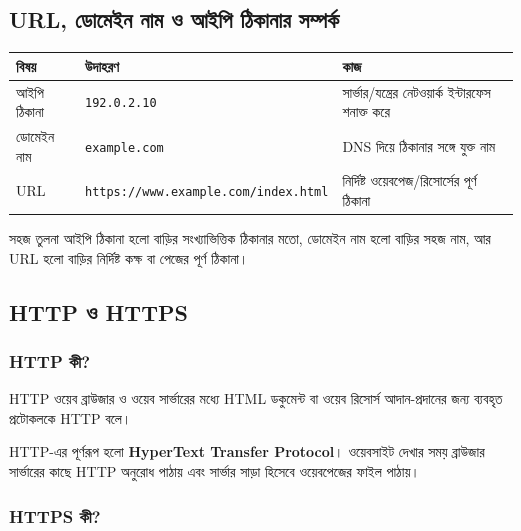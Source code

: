 \subsection{URL, ডোমেইন নাম ও আইপি ঠিকানার সম্পর্ক}

\begin{center}
\begin{tabular}{|p{}|p{}|p{}|}
\hline
\textbf{বিষয়} & \textbf{উদাহরণ} & \textbf{কাজ} \\
\hline
আইপি ঠিকানা & \texttt{192.0.2.10} & সার্ভার/যন্ত্রের নেটওয়ার্ক ইন্টারফেস শনাক্ত করে \\
\hline
ডোমেইন নাম & \texttt{example.com} & DNS দিয়ে ঠিকানার সঙ্গে যুক্ত নাম \\
\hline
URL & \texttt{https://}\newline\texttt{www.example.com/}\newline\texttt{index.html} & নির্দিষ্ট ওয়েবপেজ/রিসোর্সের পূর্ণ ঠিকানা \\
\hline
\end{tabular}
\end{center}

\begin{examplebox}{সহজ তুলনা}
আইপি ঠিকানা হলো বাড়ির সংখ্যাভিত্তিক ঠিকানার মতো, ডোমেইন নাম হলো বাড়ির সহজ নাম, আর URL হলো বাড়ির নির্দিষ্ট কক্ষ বা পেজের পূর্ণ ঠিকানা।
\end{examplebox}

\subsection{HTTP ও HTTPS}

\subsubsection{HTTP কী?}

\begin{definitionbox}{HTTP}
ওয়েব ব্রাউজার ও ওয়েব সার্ভারের মধ্যে HTML ডকুমেন্ট বা ওয়েব রিসোর্স আদান-প্রদানের জন্য ব্যবহৃত প্রটোকলকে HTTP বলে।
\end{definitionbox}

HTTP-এর পূর্ণরূপ হলো \textbf{HyperText Transfer Protocol}। ওয়েবসাইট দেখার সময় ব্রাউজার সার্ভারের কাছে HTTP অনুরোধ পাঠায় এবং সার্ভার সাড়া হিসেবে ওয়েবপেজের ফাইল পাঠায়।

\subsubsection{HTTPS কী?}

